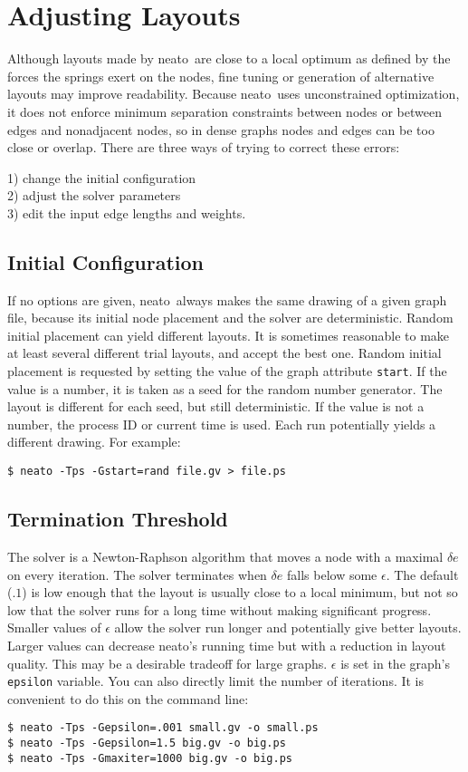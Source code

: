 \documentclass[11pt]{article}
\def\neato{{\sc neato}}
\begin{document}
\section{Adjusting Layouts}
Although layouts made by \neato\ are close to a local optimum
as defined by the forces the springs exert on the nodes,
fine tuning or generation of alternative layouts may improve readability.
Because \neato\ uses unconstrained optimization, it does not enforce
minimum separation constraints between nodes or between edges and
nonadjacent nodes, so in dense graphs nodes and edges can be too
close or overlap.  There are three ways of trying to correct these errors:
\begin{obeylines}
1) change the initial configuration
2) adjust the solver parameters
3) edit the input edge lengths and weights.
\end{obeylines}

\subsection{Initial Configuration}
If no options are given,
\neato\ always makes the same drawing of a given graph file,
because its initial node placement and the solver are deterministic.
Random initial placement can yield different layouts.
It is sometimes reasonable to make at least several different
trial layouts, and accept the best one.
Random initial placement is requested by setting the value of the
graph attribute \verb"start".
If the value is a number, it is taken as a seed for the random number
generator. The layout is different for each seed, but still deterministic.
If the value is not a number, the process ID or current time is used.
Each run potentially yields a different drawing.  For example:
\begin{verbatim}
$ neato -Tps -Gstart=rand file.gv > file.ps
\end{verbatim}

\subsection{Termination Threshold}
The solver is a Newton-Raphson algorithm that moves a node
with a maximal $\delta e$ on every iteration.
The solver terminates when $\delta e$ falls below some $\epsilon$.
The default ($.1$) is low enough that the layout is usually
close to a local minimum, but not so low that the solver runs
for a long time without making significant progress.
Smaller values of $\epsilon$ allow the solver run longer and 
potentially give better layouts.  Larger values can decrease
\neato's running time but with a reduction in layout quality.
This may be a desirable tradeoff for large graphs.
$\epsilon$ is set in the graph's \verb"epsilon" variable.
You can also directly limit the number of iterations.
It is convenient to do this on the command line:
\begin{verbatim}
$ neato -Tps -Gepsilon=.001 small.gv -o small.ps
$ neato -Tps -Gepsilon=1.5 big.gv -o big.ps
$ neato -Tps -Gmaxiter=1000 big.gv -o big.ps
\end{verbatim}
\end{document}
